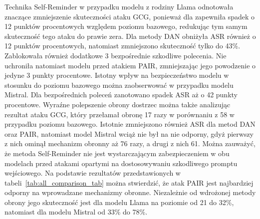 Technika Self-Reminder w przypadku modelu z rodziny Llama odnotowała znaczące zmniejszenie skuteczności ataku \gls{GCG}, ponieważ dla zapewniła spadek o 12 punktów procentowych względem poziomu bazowego, redukując tym samym skuteczność tego ataku do prawie zera. Dla metody \gls{DAN} obniżyła \gls{ASR} również o 12 punktów procentowych, natomiast zmniejszono skuteczność tylko do 43\%.  Zablokowała również dodatkowe 3 bezpośrednie szkodliwe polecenia. Nie uchroniła natomiast modelu przed atakiem \gls{PAIR}, zmniejszając jego powodzenie o jedyne 3 punkty procentowe. Istotny wpływ na bezpieczeństwo modelu w stosunku do poziomu bazowego można zaobserwować w przypadku modelu Mistral. Dla bezpośrednich poleceń zanotowano spadek \gls{ASR} aż o 42 punkty procentowe. Wyraźne polepszenie obrony dostrzec można także analizując rezultat ataku \gls{GCG}, który przełamał obronę 17 razy w porównaniu z 58 w przypadku poziomu bazowego. Istotnie zmniejszono również \gls{ASR} dla metod \gls{DAN} oraz \gls{PAIR}, natomiast model Mistral wciąż nie był na nie odporny, gdyż pierwszy z nich ominął mechanizm obronny aż 76 razy, a drugi z nich 61. Można zauważyć, że metoda Self-Reminder nie jest wystarczającym zabezpieczeniem w obu modelach przed atakami opartymi na dostosowywaniu szkodliwego promptu wejściowego.
Na podstawie rezultatów przedstawionych w tabeli~\ref{tab:all_comparison_tab} można stwierdzić, że atak \gls{PAIR} jest najbardziej odporny na wprowadzane mechanizmy obronne. Niezależnie od wdrożonej metody obrony jego skuteczność jest dla modelu Llama na poziomie od 21 do 32\%, natomiast dla modelu Mistral od 33\% do 78\%.
